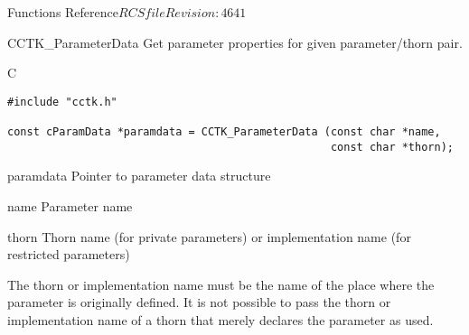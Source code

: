 \begin{cactuspart}{ Functions Reference}{$RCSfile$}{$Revision: 4641 $}
\begin{FunctionDescription}{CCTK\_ParameterData}
\label{CCTK-ParameterData}
Get parameter properties for given parameter/thorn pair.

\begin{SynopsisSection}
\begin{Synopsis}{C}
\begin{verbatim}
#include "cctk.h"

const cParamData *paramdata = CCTK_ParameterData (const char *name,
                                                  const char *thorn);
\end{verbatim}
\end{Synopsis}
\end{SynopsisSection}

\begin{ResultSection}
\begin{Result}{paramdata}
Pointer to parameter data structure
\end{Result}
\end{ResultSection}

\begin{ParameterSection}
\begin{Parameter}{name}
Parameter name
\end{Parameter}
\begin{Parameter}{thorn}
Thorn name (for private parameters) or implementation name (for
restricted parameters)
\end{Parameter}
\end{ParameterSection}

\begin{Discussion}
The thorn or implementation name must be the name of the place where
the parameter is originally defined.  It is not possible to pass the
thorn or implementation name of a thorn that merely declares the
parameter as used.
\end{Discussion}


\end{FunctionDescription}
\end{cactuspart}
